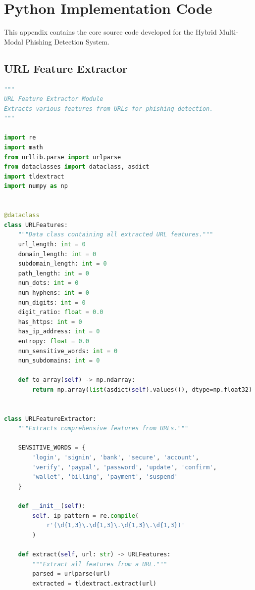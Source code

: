 \documentclass[12pt,a4paper]{report}
\begin{document}
\appendix
\chapter{Python Implementation Code}

This appendix contains the core source code developed for the Hybrid Multi-Modal Phishing Detection System.

\section{URL Feature Extractor}

\begin{lstlisting}[language=Python, caption=URL Feature Extractor Implementation]
"""
URL Feature Extractor Module
Extracts various features from URLs for phishing detection.
"""

import re
import math
from urllib.parse import urlparse
from dataclasses import dataclass, asdict
import tldextract
import numpy as np


@dataclass
class URLFeatures:
    """Data class containing all extracted URL features."""
    url_length: int = 0
    domain_length: int = 0
    subdomain_length: int = 0
    path_length: int = 0
    num_dots: int = 0
    num_hyphens: int = 0
    num_digits: int = 0
    digit_ratio: float = 0.0
    has_https: int = 0
    has_ip_address: int = 0
    entropy: float = 0.0
    num_sensitive_words: int = 0
    num_subdomains: int = 0
    
    def to_array(self) -> np.ndarray:
        return np.array(list(asdict(self).values()), dtype=np.float32)


class URLFeatureExtractor:
    """Extracts comprehensive features from URLs."""
    
    SENSITIVE_WORDS = {
        'login', 'signin', 'bank', 'secure', 'account',
        'verify', 'paypal', 'password', 'update', 'confirm',
        'wallet', 'billing', 'payment', 'suspend'
    }
    
    def __init__(self):
        self._ip_pattern = re.compile(
            r'(\d{1,3}\.\d{1,3}\.\d{1,3}\.\d{1,3})'
        )
    
    def extract(self, url: str) -> URLFeatures:
        """Extract all features from a URL."""
        parsed = urlparse(url)
        extracted = tldextract.extract(url)
        

\end{lstlisting}
\end{document}
